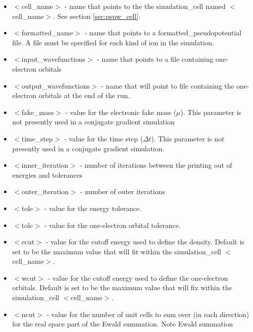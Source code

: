 \begin{itemize}
        \item $<$cell\_name$>$ - name that points to the
              the simulation\_cell named $<$cell\_name$>$.  See section \ref{sec:pspw_cell}.
        \item $<$formatted\_name$>$ - name that points
              to a formatted\_pseudopotential file.  A file must
              be specified for each kind of ion in the simulation.
        \item $<$input\_wavefunctions$>$ - name that points
              to a file containing one-electron orbitals
        \item $<$output\_wavefunctions$>$ - name that will
              point to file containing the one-electron orbitals at the
              end of the run. 
        \item $<$fake\_mass$>$ - value for the electronic
              fake mass ($\mu$). This parameter is not presently used in a 
              conjugate gradient simulation
        \item $<$time\_step$>$ - value for the time step ($\Delta t$).  This
              parameter is not presently used in a conjugate gradient simulation.
        \item $<$inner\_iteration$>$ - number of iterations between the 
              printing out of energies and tolerances
        \item $<$outer\_iteration$>$ - number of outer iterations
        \item $<$tole$>$ - value for the energy tolerance.
        \item $<$tolc$>$ - value for the one-electron orbital tolerance.
        \item $<$ecut$>$ - value for the cutoff energy used
                           to define the density. Default is set
                           to be the maximum value that will fit
                           within the simulation\_cell $<$cell\_name$>$.
        \item $<$wcut$>$ - value for the cutoff energy used
                           to define the one-electron orbitals.
                           Default is set to be the maximum value that 
                           will fix within the simulation\_cell $<$cell\_name$>$.
        \item $<$ncut$>$ - value for the number of unit cells
                          to sum over (in each direction) for the real space
                          part of the Ewald summation. Note Ewald summation

\end{itemize}
